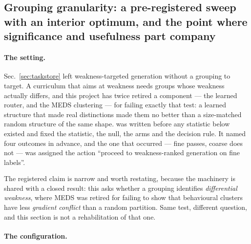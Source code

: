 \subsection{Grouping granularity: a pre-registered sweep with an interior optimum, and the
point where significance and usefulness part company}
\label{sec:granularity}

\paragraph{The setting.} Sec.~\ref{sec:taskstore} left weakness-targeted generation without a
grouping to target. A curriculum that aims at weakness needs groups whose weakness actually
differs, and this project has twice retired a component --- the learned router, and the MEDS
clustering --- for failing exactly that test: a learned structure that made real distinctions
made them no better than a size-matched random structure of the same shape.
 was written before any statistic below existed and fixed the
statistic, the null, the arms and the decision rule. It named four outcomes in advance, and the
one that occurred --- fine passes, coarse does not --- was assigned the action ``proceed to
weakness-ranked generation on fine labels''.

The registered claim is narrow and worth restating, because the machinery is shared with a
closed result: this asks whether a grouping identifies \emph{differential weakness}, where MEDS
was retired for failing to show that behavioural clusters have less \emph{gradient conflict}
than a random partition. Same test, different question, and this section is not a
rehabilitation of that one.

\paragraph{The configuration.}

